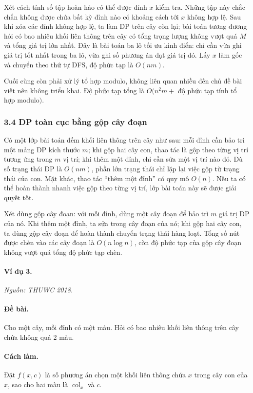 \documentclass[11pt]{article}
\begin{document}
Xét cách tính số tập hoàn hảo có thể được đỉnh \(x\) kiểm tra. Những tập này
chắc chắn không được chứa bất kỳ đỉnh nào có khoảng cách tới \(x\) không hợp lệ.
Sau khi xóa các đỉnh không hợp lệ, ta làm DP trên cây còn lại; bài toán tương
đương hỏi có bao nhiêu khối liên thông trên cây có tổng trọng lượng không vượt
quá \(M\) và tổng giá trị lớn nhất. Đây là bài toán ba lô tối ưu kinh điển: chỉ
cần vừa ghi giá trị tốt nhất trong ba lô, vừa ghi số phương án đạt giá trị đó.
Lấy \(x\) làm gốc và chuyển theo thứ tự DFS, độ phức tạp là \(O(nm)\).

Cuối cùng còn phải xử lý tổ hợp modulo, không liên quan nhiều đến chủ đề bài
viết nên không triển khai. Độ phức tạp tổng là \(O(n^2m+\) độ phức tạp tính tổ
hợp modulo\()\).

\subsubsection*{3.4 DP toàn cục bằng gộp cây đoạn}

Có một lớp bài toán đếm khối liên thông trên cây như sau: mỗi đỉnh cần bảo trì
một mảng DP kích thước \(m\); khi gộp hai cây con, thao tác là gộp theo từng vị
trí tương ứng trong \(m\) vị trí; khi thêm một đỉnh, chỉ cần sửa một vị trí nào
đó. Dù số trạng thái DP là \(O(nm)\), phần lớn trạng thái chỉ lặp lại việc gộp
từ trạng thái của con. Mặt khác, thao tác ``thêm một đỉnh'' có quy mô \(O(n)\).
Nếu ta có thể hoàn thành nhanh việc gộp theo từng vị trí, lớp bài toán này sẽ
được giải quyết tốt.

Xét dùng gộp cây đoạn: với mỗi đỉnh, dùng một cây đoạn để bảo trì \(m\) giá trị
DP của nó. Khi thêm một đỉnh, ta sửa trong cây đoạn của nó; khi gộp hai cây con,
ta dùng gộp cây đoạn để hoàn thành chuyển trạng thái hàng loạt. Tổng số nút được
chèn vào các cây đoạn là \(O(n\log n)\), còn độ phức tạp của gộp cây đoạn không
vượt quá tổng độ phức tạp chèn.

\paragraph{Ví dụ 3.}
\emph{Nguồn: THUWC 2018.}

\paragraph{Đề bài.}
Cho một cây, mỗi đỉnh có một màu. Hỏi có bao nhiêu khối liên thông trên cây chứa
không quá \(2\) màu.

\paragraph{Cách làm.}
Đặt \(f(x,c)\) là số phương án chọn một khối liên thông chứa \(x\) trong cây con
của \(x\), sao cho hai màu là \(\operatorname{col}_x\) và \(c\).
\end{document}
